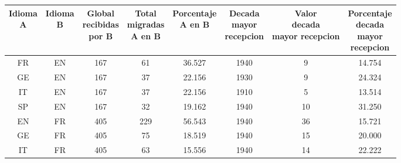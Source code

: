\documentclass[10pt,letterpaper]{article} %
\begin{document}
\begin{table}
	\centering
	\begin{tabular}{cccccccc}
		\toprule
		\thead{Idioma \\ A} & \thead{Idioma \\ B} & \thead{Global \\ recibidas \\ por B} & \thead{Total \\ migradas \\ A en B} & \thead{Porcentaje \\ A en B} & \thead{Decada \\ mayor \\ recepcion} & \thead{Valor \\decada \\ mayor recepcion} & \thead{Porcentaje \\decada \\ mayor \\recepcion} \\
		\midrule
		FR &       EN &                     167 &                     61 &             36.527 &                    1940 &                             9 &                             14.754 \\
		GE &       EN &                     167 &                     37 &             22.156 &                    1930 &                             9 &                             24.324 \\
		IT &       EN &                     167 &                     37 &             22.156 &                    1910 &                             5 &                             13.514 \\
		SP &       EN &                     167 &                     32 &             19.162 &                    1940 &                            10 &                             31.250 \\
		EN &       FR &                     405 &                    229 &             56.543 &                    1940 &                            36 &                             15.721 \\
		GE &       FR &                     405 &                     75 &             18.519 &                    1940 &                            15 &                             20.000 \\
		IT &       FR &                     405 &                     63 &             15.556 &                    1940 &                            14 &                             22.222 \\

\end{tabular}
\end{table}
\end{document}
